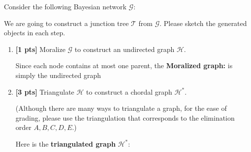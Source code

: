 \documentclass[12pt]{article} \usepackage[utf8]{inputenc}
\newcommand{\Gcal}{\mathcal{G}}
\newcommand{\Hcal}{\mathcal{H}}
\newcommand{\Tcal}{\mathcal{T}}
\begin{document}
Consider the following Bayesian network $ \Gcal $:
\begin{figure}[h]
\centering
{}
\end{figure}

We are going to construct a junction tree $ \Tcal $ from $ \Gcal $.
Please sketch the generated objects in each step.

\begin{enumerate}
\item \textbf{[1 pts]} Moralize $ \Gcal $ to construct an undirected graph $ \Hcal $.
\begin{solution}
    Since each node contains at most one parent, the \textbf{Moralized
    graph:} is simply the undirected graph\\[4pt]
  \begin{center}
  \end{center}
\end{solution}


\item \textbf{[3 pts]} Triangulate $ \Hcal $ to construct a chordal graph $ \Hcal^* $. 

(Although there are many ways to triangulate a graph, for the ease of grading, please use the triangulation that corresponds to the elimination order $ A, B, C, D, E $.)
\begin{solution}
  Here is the \textbf{triangulated graph} $\Hcal^{*}$:\\
  \begin{center}
  \end{center}
\end{solution}




\end{enumerate}
\end{document}
